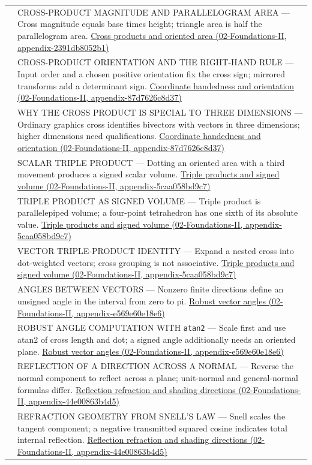 {\begin{longtable}[]{@{}
  >{\raggedright\arraybackslash}p{}
  >{\raggedright\arraybackslash}p{}@{}}
545 & CROSS-PRODUCT MAGNITUDE AND PARALLELOGRAM AREA --- Cross magnitude equals base times height; triangle area is half the parallelogram area. \href{}{Cross products and oriented area (02-Foundations-II, appendix-2391db8052b1)} \\
546 & CROSS-PRODUCT ORIENTATION AND THE RIGHT-HAND RULE --- Input order and a chosen positive orientation fix the cross sign; mirrored transforms add a determinant sign. \href{}{Coordinate handedness and orientation (02-Foundations-II, appendix-87d7626c8d37)} \\
547 & WHY THE CROSS PRODUCT IS SPECIAL TO THREE DIMENSIONS --- Ordinary graphics cross identifies bivectors with vectors in three dimensions; higher dimensions need qualifications. \href{}{Coordinate handedness and orientation (02-Foundations-II, appendix-87d7626c8d37)} \\
548 & SCALAR TRIPLE PRODUCT --- Dotting an oriented area with a third movement produces a signed scalar volume. \href{}{Triple products and signed volume (02-Foundations-II, appendix-5caa058bd9c7)} \\
549 & TRIPLE PRODUCT AS SIGNED VOLUME --- Triple product is parallelepiped volume; a four-point tetrahedron has one sixth of its absolute value. \href{}{Triple products and signed volume (02-Foundations-II, appendix-5caa058bd9c7)} \\
550 & VECTOR TRIPLE-PRODUCT IDENTITY --- Expand a nested cross into dot-weighted vectors; cross grouping is not associative. \href{}{Triple products and signed volume (02-Foundations-II, appendix-5caa058bd9c7)} \\
551 & ANGLES BETWEEN VECTORS --- Nonzero finite directions define an unsigned angle in the interval from zero to pi. \href{}{Robust vector angles (02-Foundations-II, appendix-e569e60e18e6)} \\
552 & ROBUST ANGLE COMPUTATION WITH \texttt{atan2} --- Scale first and use atan2 of cross length and dot; a signed angle additionally needs an oriented plane. \href{}{Robust vector angles (02-Foundations-II, appendix-e569e60e18e6)} \\
553 & REFLECTION OF A DIRECTION ACROSS A NORMAL --- Reverse the normal component to reflect across a plane; unit-normal and general-normal formulas differ. \href{}{Reflection refraction and shading directions (02-Foundations-II, appendix-44e00863b4d5)} \\
554 & REFRACTION GEOMETRY FROM SNELL'S LAW --- Snell scales the tangent component; a negative transmitted squared cosine indicates total internal reflection. \href{}{Reflection refraction and shading directions (02-Foundations-II, appendix-44e00863b4d5)} \\

\end{longtable}}
